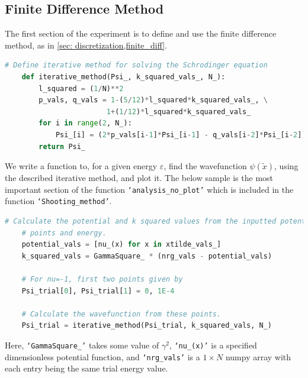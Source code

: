 \documentclass[10pt,a4paper]{article}
\theoremstyle{definition}
\theoremstyle{remark}
\begin{document}
\subsection{Finite Difference Method}
The first section of the experiment is to define and use the finite difference method, as in \ref{sec: discretization,finite_diff}.
\begin{lstlisting}[language=Python]
    # Define iterative method for solving the Schrodinger equation
    def iterative_method(Psi_, k_squared_vals_, N_):
        l_squared = (1/N)**2
        p_vals, q_vals = 1-(5/12)*l_squared*k_squared_vals_, \
                        1+(1/12)*l_squared*k_squared_vals_
        for i in range(2, N_):
            Psi_[i] = (2*p_vals[i-1]*Psi_[i-1] - q_vals[i-2]*Psi_[i-2])/q_vals[i]
        return Psi_
\end{lstlisting}
We write a function to, for a given energy $\varepsilon$, find the wavefunction $\psi(\tilde{x})$, using the described iterative method, and plot it. The below sample is the most important section of the function \texttt{`analysis\_no\_plot'} which is included in the function \texttt{`Shooting\_method'}.
\begin{lstlisting}[language=Python]
    # Calculate the potential and k squared values from the inputted potential.
    # points and energy.
    potential_vals = [nu_(x) for x in xtilde_vals_]
    k_squared_vals = GammaSquare_ * (nrg_vals - potential_vals)

    # For nu=-1, first two points given by
    Psi_trial[0], Psi_trial[1] = 0, 1E-4

    # Calculate the wavefunction from these points.
    Psi_trial = iterative_method(Psi_trial, k_squared_vals, N_)
\end{lstlisting}
Here, \texttt{`GammaSquare\_'} takes some value of $\gamma^2$, \texttt{`nu\_(x)'} is a specified dimensionless potential function, and  \texttt{`nrg\_vals'} is a $1\times N$ numpy array with each entry being the same trial energy value.
\end{document}
